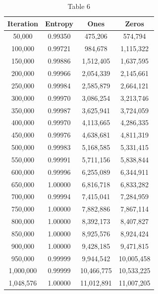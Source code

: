 \documentclass[preprint]{sigplanconf}
\begin{document}
\begin{table}
    \begin{center}
    \begin{tabular}{|c|c|c|c|}
        \hline
        \textbf{Iteration} & \textbf{Entropy} & \textbf{Ones} & \textbf{Zeros} \\
        \hline
        50,000             & 0.99350          & 475,206       & 574,794        \\
        100,000            & 0.99721          & 984,678       & 1,115,322      \\
        150,000            & 0.99886          & 1,512,405     & 1,637,595      \\
        200,000            & 0.99966          & 2,054,339     & 2,145,661      \\
        250,000            & 0.99984          & 2,585,879     & 2,664,121      \\
        300,000            & 0.99970          & 3,086,254     & 3,213,746      \\
        350,000            & 0.99987          & 3,625,941     & 3,724,059      \\
        400,000            & 0.99970          & 4,113,665     & 4,286,335      \\
        450,000            & 0.99976          & 4,638,681     & 4,811,319      \\
        500,000            & 0.99983          & 5,168,585     & 5,331,415      \\
        550,000            & 0.99991          & 5,711,156     & 5,838,844      \\
        600,000            & 0.99996          & 6,255,089     & 6,344,911      \\
        650,000            & 1.00000          & 6,816,718     & 6,833,282      \\
        700,000            & 0.99994          & 7,415,041     & 7,284,959      \\
        750,000            & 1.00000          & 7,882,886     & 7,867,114      \\
        800,000            & 1.00000          & 8,392,173     & 8,407,827      \\
        850,000            & 1.00000          & 8,925,576     & 8,924,424      \\
        900,000            & 1.00000          & 9,428,185     & 9,471,815      \\
        950,000            & 0.99999          & 9,944,542     & 10,005,458     \\
        1,000,000          & 0.99999          & 10,466,775    & 10,533,225     \\
        1,048,576          & 1.00000          & 11,012,891    & 11,007,205     \\
        \hline
    \end{tabular}
    \caption{Table 6}
    \label{tab-6}
\end{center}
\end{table}
\end{document}
